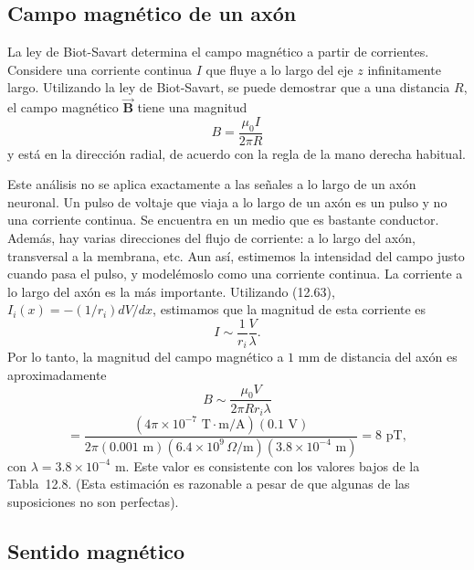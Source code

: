 \documentclass[12pt]{book}
\begin{document}
\subsection{Campo magnético de un axón}

La ley de Biot-Savart determina el campo magnético a partir de corrientes. Considere una corriente continua $I$ que fluye a lo largo del eje $z$ infinitamente largo. Utilizando la ley de Biot-Savart, se puede demostrar que a una distancia $R$, el campo magnético $\vec{\mathbf{B}}$ tiene una magnitud
\begin{equation}
B = \frac{\mu_0 I}{2\pi R}
\label{eq:12.89}
\end{equation}
y está en la dirección radial, de acuerdo con la regla de la mano derecha habitual.

Este análisis no se aplica exactamente a las señales a lo largo de un axón neuronal. Un pulso de voltaje que viaja a lo largo de un axón es un pulso y no una corriente continua. Se encuentra en un medio que es bastante conductor. Además, hay varias direcciones del flujo de corriente: a lo largo del axón, transversal a la membrana, etc. Aun así, estimemos la intensidad del campo justo cuando pasa el pulso, y modelémoslo como una corriente continua. La corriente a lo largo del axón es la más importante. Utilizando (12.63), $I_i(x) = -(1/r_i) dV/dx$, estimamos que la magnitud de esta corriente es
\begin{equation}
I \sim \frac{1}{r_i} \frac{V}{\lambda}.
\label{eq:12.90}
\end{equation}
Por lo tanto, la magnitud del campo magnético a $1\text{ mm}$ de distancia del axón es aproximadamente
\begin{equation}
B \sim \frac{\mu_0 V}{2\pi R r_i \lambda}
\label{eq:12.91}
\end{equation}
\begin{equation}
= \frac{(4\pi \times 10^{-7}\text{ T}\cdot\text{m/A})(0.1\text{ V})}{2\pi (0.001\text{ m})(6.4 \times 10^9\,\Omega\text{/m})(3.8 \times 10^{-4}\text{ m})} = 8\text{ pT},
\label{eq:12.92}
\end{equation}
con $\lambda = 3.8 \times 10^{-4}\text{ m}$. Este valor es consistente con los valores bajos de la Tabla~12.8. (Esta estimación es razonable a pesar de que algunas de las suposiciones no son perfectas).

\subsection{Sentido magnético}
\end{document}
